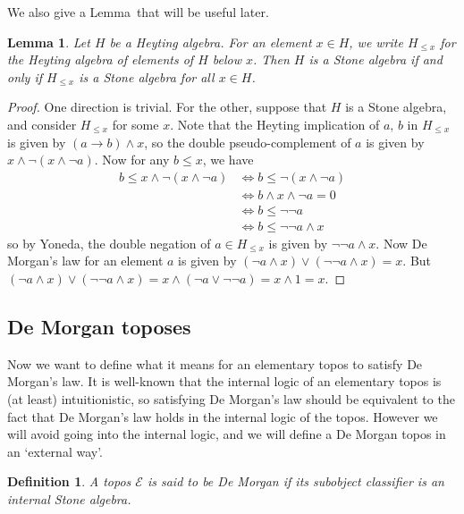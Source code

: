 \documentclass{article}
\newtheorem{Lemma}[theorem]{Lemma}
\newtheorem{definition}[theorem]{Definition}
\begin{document}
We also give a Lemma~that will be useful later.

\begin{Lemma}\label{Hleqx}
    Let $H$ be a Heyting algebra. For an element $x\in H$, we write $H_{\leq x}$ for the Heyting algebra of elements of $H$ below $x$. Then $H$ is a Stone algebra if and only if $H_{\leq x}$ is a Stone algebra for all $x\in H$.
\end{Lemma}
\begin{proof}
    One direction is trivial. For the other, suppose that $H$ is a Stone algebra, and consider $H_{\leq x}$ for some $x$. Note that the Heyting implication of $a,\,b$ in $H_{\leq x}$ is given by $(a\rightarrow b)\land x$, so the double pseudo-complement of $a$ is given by $x\land \neg(x\land\neg a)$. Now for any $b\leq x$, we have 
\begin{align*}
    b\leq x\land \neg(x\land\neg a) & \iff b\leq \neg(x\land\neg a)\\
    & \iff b\land x \land \neg a=0\\
    & \iff b\leq\neg\neg a\\
    & \iff b\leq\neg\neg a\land x
\end{align*}
so by Yoneda, the double negation of $a\in H_{\leq x}$ is given by $\neg\neg a\land x$. Now De Morgan's law for an element $a$ is given by $(\neg a\land x)\lor(\neg\neg a \land x)=x$. But $(\neg a\land x)\lor(\neg\neg a \land x)=x\land(\neg a\lor\neg\neg a)=x\land 1=x$.
\end{proof}


\subsection{De Morgan toposes}

Now we want to define what it means for an elementary topos to satisfy De Morgan's law. It is well-known that the internal logic of an elementary topos is (at least) intuitionistic, so satisfying De Morgan's law should be equivalent to the fact that De Morgan's law holds in the internal logic of the topos. However we will avoid going into the internal logic, and we will define a De Morgan topos in an `external way'. 

\begin{definition}
    A topos $\mathcal{E}$ is said to be De Morgan if its subobject classifier is an internal Stone algebra.
\end{definition}
\end{document}
